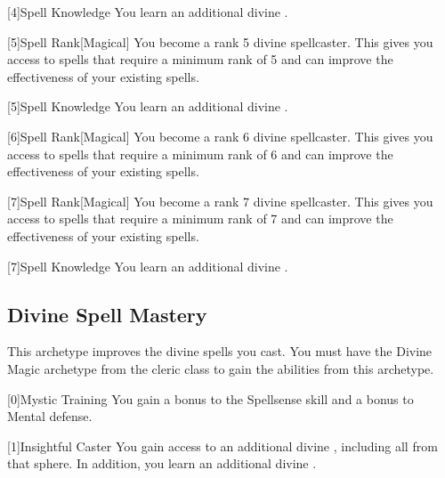         [4]{Spell Knowledge} You learn an additional divine .

        [5]{Spell Rank}[Magical] You become a rank 5 divine spellcaster.
        This gives you access to spells that require a minimum rank of 5 and can improve the effectiveness of your existing spells.

        [5]{Spell Knowledge} You learn an additional divine .

        [6]{Spell Rank}[Magical] You become a rank 6 divine spellcaster.
        This gives you access to spells that require a minimum rank of 6 and can improve the effectiveness of your existing spells.

        [7]{Spell Rank}[Magical] You become a rank 7 divine spellcaster.
        This gives you access to spells that require a minimum rank of 7 and can improve the effectiveness of your existing spells.

        [7]{Spell Knowledge} You learn an additional divine .

    \newpage
    \subsection{Divine Spell Mastery}
        This archetype improves the divine spells you cast.
        You must have the Divine Magic archetype from the cleric class to gain the abilities from this archetype.

        [0]{Mystic Training} You gain a  bonus to the Spellsense skill and a  bonus to Mental defense.

        [1]{Insightful Caster} You gain access to an additional divine , including all  from that sphere.
        In addition, you learn an additional divine .

